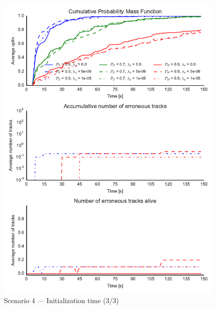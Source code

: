 \begin{figure}
\centering
\includegraphics{Figures/plots/Scenario4_Init-Time(3-3).pdf}
\caption{Scenario 4 --- Initialization time (3/3)}\label{fig:init4_time_3-3}
\end{figure}

